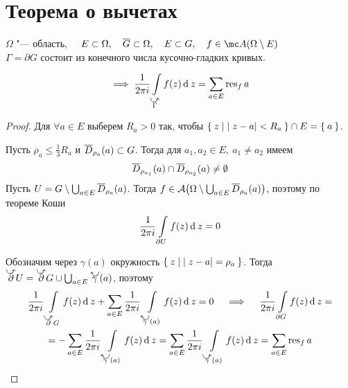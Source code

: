 \section{Теорема о вычетах}

\begin{theorem}
	$ \Omega $ "--- область, $ \quad E \sub \Omega, \quad \ol G \sub \Omega, \quad E \sub G, \quad f \in \mc A(\Omega \setminus E) $ \\
	$ \Gamma = \partial G $ состоит из конечного числа кусочно-гладких кривых.

	$$ \implies \frac1{2\pi i} \int\limits_{\curvedir \Gamma} f(z) \di z = \sum_{a \in E} \res_f a $$
\end{theorem}

\begin{proof}
	Для $ \forall a \in E $ выберем $ R_a > 0 $ так, чтобы $ \Set{z \mid |z - a| < R_a} \cap E = \Set a $.

	Пусть $ \rho_a \le \frac13 R_a $ и $ \overline D_{\rho_a}(a) \subset G $. Тогда для $ a_1, a_2 \in E, ~ a_1 \ne a_2 $ имеем
	$$ \overline D_{\rho_{a_1}}(a) \cap \overline D_{\rho_{a_2}}(a) \ne \emptyset $$
	Пусть $ U = G \setminus \bigcup_{a \in E} \overline D_{\rho_a}(a) $.
	Тогда $ f \in \mathcal A \big( \Omega \setminus \bigcup_{a \in E} \overline D_{\rho_a}(a) \big) $, поэтому по теореме Коши
	$$ \frac1{2\pi i} \int\limits_{\partial U} f(z) \operatorname{d}^{} z = 0 $$

	Обозначим через $ \gamma(a) $ окружность $ \Set{z \mid |z - a| = \rho_a} $. Тогда $ \curvedir \partial U = \curvedir \partial G \cup \bigcup_{a \in E} \curvedir[0] \gamma(a) $, поэтому
	\begin{multline*}
		\frac1{2\pi i} \int\limits_{\curvedir\partial G} f(z) \di z + \sum_{a \in E} 	\frac1{2\pi i} \int\limits_{\curvedir[0]\gamma(a)} f(z) \di z = 0 \quad \implies \quad \frac1{2\pi i} \int\limits_{\partial G} f(z) \di z = \\
		= - \sum_{a \in E} \frac1{2\pi i} \int\limits_{\curvedir[0]\gamma(a)} f(z) \di z = \sum_{a \in E} \frac1{2\pi i} \int\limits_{\curvedir \gamma(a)} f(z) \di z = \sum_{a \in E} \res_f a
	\end{multline*}
\end{proof}
